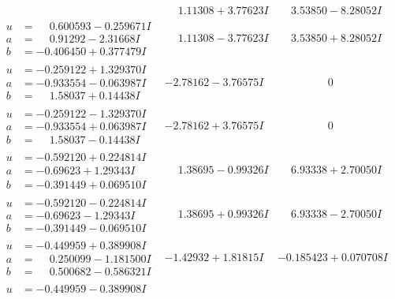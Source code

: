 \documentclass[1p]{elsarticle_modified}
\theoremstyle{definition}
\begin{document}
$$\begin{array}{c|c|c}
 & \phantom{-}1.11308 + 3.77623 I & \phantom{-}3.53850 - 8.28052 I \\ \hline\begin{aligned}
u &= \phantom{-}0.600593 - 0.259671 I \\
a &= \phantom{-}0.91292 - 2.31668 I \\
b &= -0.406450 + 0.377479 I\end{aligned}
 & \phantom{-}1.11308 - 3.77623 I & \phantom{-}3.53850 + 8.28052 I \\ \hline\begin{aligned}
u &= -0.259122 + 1.329370 I \\
a &= -0.933554 - 0.063987 I \\
b &= \phantom{-}1.58037 + 0.14438 I\end{aligned}
 & -2.78162 - 3.76575 I & \phantom{-0.000000 } 0 \\ \hline\begin{aligned}
u &= -0.259122 - 1.329370 I \\
a &= -0.933554 + 0.063987 I \\
b &= \phantom{-}1.58037 - 0.14438 I\end{aligned}
 & -2.78162 + 3.76575 I & \phantom{-0.000000 } 0 \\ \hline\begin{aligned}
u &= -0.592120 + 0.224814 I \\
a &= -0.69623 + 1.29343 I \\
b &= -0.391449 + 0.069510 I\end{aligned}
 & \phantom{-}1.38695 - 0.99326 I & \phantom{-}6.93338 + 2.70050 I \\ \hline\begin{aligned}
u &= -0.592120 - 0.224814 I \\
a &= -0.69623 - 1.29343 I \\
b &= -0.391449 - 0.069510 I\end{aligned}
 & \phantom{-}1.38695 + 0.99326 I & \phantom{-}6.93338 - 2.70050 I \\ \hline\begin{aligned}
u &= -0.449959 + 0.389908 I \\
a &= \phantom{-}0.250099 - 1.181500 I \\
b &= \phantom{-}0.500682 - 0.586321 I\end{aligned}
 & -1.42932 + 1.81815 I & -0.185423 + 0.070708 I \\ \hline\begin{aligned}
u &= -0.449959 - 0.389908 I \\

\end{aligned}
\end{array}$$
\end{document}
